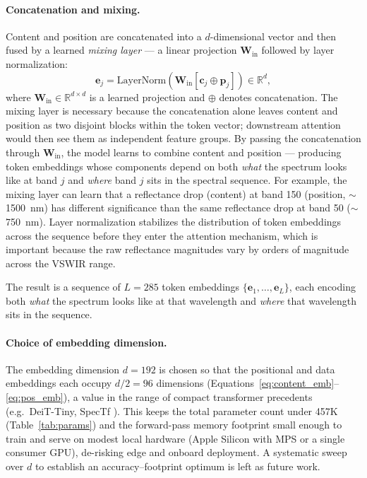 \documentclass[11pt]{report}
\newcommand{\R}{\mathbb{R}}
\begin{document}
\paragraph{Concatenation and mixing.}
Content and position are concatenated into a $d$-dimensional vector and then fused by a learned \emph{mixing layer} --- a linear projection $\mathbf{W}_{\text{in}}$ followed by layer normalization:
\begin{equation}
\mathbf{e}_j = \text{LayerNorm}\left(\mathbf{W}_{\text{in}}\left[\mathbf{c}_j \oplus \mathbf{p}_j\right]\right) \in \R^{d},
\label{eq:token_embed}
\end{equation}
where $\mathbf{W}_{\text{in}} \in \R^{d \times d}$ is a learned projection and $\oplus$ denotes concatenation.
The mixing layer is necessary because the concatenation alone leaves content and position as two disjoint blocks within the token vector; downstream attention would then see them as independent feature groups. By passing the concatenation through $\mathbf{W}_{\text{in}}$, the model learns to combine content and position --- producing token embeddings whose components depend on both \emph{what} the spectrum looks like at band $j$ and \emph{where} band $j$ sits in the spectral sequence. For example, the mixing layer can learn that a reflectance drop (content) at band 150 (position, $\sim$1500~nm) has different significance than the same reflectance drop at band 50 ($\sim$750~nm).
Layer normalization stabilizes the distribution of token embeddings across the sequence before they enter the attention mechanism, which is important because the raw reflectance magnitudes vary by orders of magnitude across the VSWIR range.

The result is a sequence of $L = 285$ token embeddings $\{\mathbf{e}_1, \ldots, \mathbf{e}_L\}$, each encoding both \emph{what} the spectrum looks like at that wavelength and \emph{where} that wavelength sits in the sequence.

\paragraph{Choice of embedding dimension.}
The embedding dimension $d = 192$ is chosen so that the positional and data embeddings each occupy $d/2 = 96$ dimensions (Equations~\ref{eq:content_emb}--\ref{eq:pos_emb}), a value in the range of compact transformer precedents (e.g.\ DeiT-Tiny, SpecTf \cite{lee2025spectf}). This keeps the total parameter count under 457K (Table~\ref{tab:params}) and the forward-pass memory footprint small enough to train and serve on modest local hardware (Apple Silicon with MPS or a single consumer GPU), de-risking edge and onboard deployment. A systematic sweep over $d$ to establish an accuracy--footprint optimum is left as future work.
\end{document}
